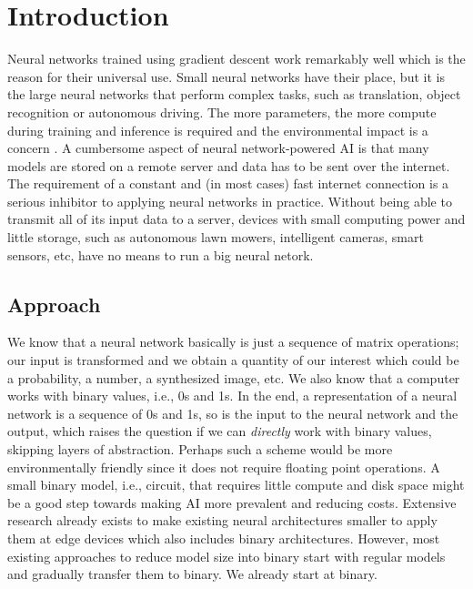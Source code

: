 \section{Introduction}
Neural networks trained using gradient descent work remarkably well which is the reason for their universal use. Small neural networks have their place, but it is the large neural networks that perform complex tasks, such as translation, object recognition or autonomous driving. The more parameters, the more compute during training and inference is required and the environmental impact is a concern \cite{bib:schwartz2020green}. A cumbersome aspect of neural network-powered AI is that many models are stored on a remote server and data has to be sent over the internet. The requirement of a constant and (in most cases) fast internet connection is a serious inhibitor to applying neural networks in practice. Without being able to transmit all of its input data to a server, devices with small computing power and little storage, such as autonomous lawn mowers, intelligent cameras, smart sensors, etc, have no means to run a big neural netork.

\subsection{Approach}
We know that a neural network basically is just a sequence of matrix operations; our input is transformed and we obtain a quantity of our interest which could be a probability, a number, a synthesized image, etc. We also know that a computer works with binary values, i.e., 0s and 1s. In the end, a representation of a neural network is a sequence of 0s and 1s, so is the input to the neural network and the output, which raises the question if we can \textit{directly} work with binary values, skipping layers of abstraction. Perhaps such a scheme would be more environmentally friendly since it does not require floating point operations. A small binary model, i.e., circuit,  that requires little compute and disk space might be a good step towards making AI more prevalent and reducing costs. Extensive research already exists to make existing neural architectures smaller to apply them at edge devices \cite{bib:liu2021bringing} which also includes binary architectures. However, most existing approaches to reduce model size into binary start with regular models and gradually transfer them to binary. We already start at binary.

